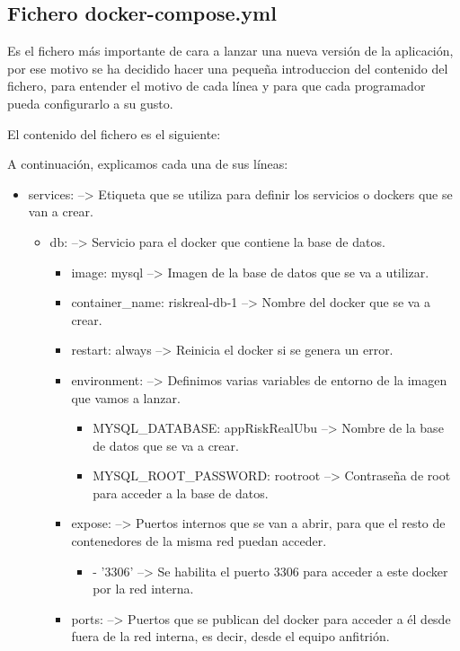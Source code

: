 \subsection{Fichero docker-compose.yml}

Es el fichero más importante de cara a lanzar una nueva versión de la aplicación, por ese motivo se ha decidido hacer una pequeña introduccion del contenido del fichero, para entender el motivo de cada línea y para que cada programador pueda configurarlo a su gusto.

El contenido del fichero es el siguiente:

A continuación, explicamos cada una de sus líneas:
\begin{itemize}
	\item services: --> Etiqueta que se utiliza para definir los servicios o dockers que se van a crear.
	\begin{itemize}
		\item db: --> Servicio para el docker que contiene la base de datos.
		\begin{itemize}
			\item image: mysql --> Imagen de la base de datos que se va a utilizar.
			\item container\_name: riskreal-db-1 --> Nombre del docker que se va a crear.
			\item restart: always --> Reinicia el docker si se genera un error.
			\item environment: --> Definimos varias variables de entorno de la imagen que vamos a lanzar.
			\begin{itemize}
				\item MYSQL\_DATABASE: appRiskRealUbu --> Nombre de la base de datos que se va a crear.
				\item MYSQL\_ROOT\_PASSWORD: rootroot --> Contraseña de root para acceder a la base de datos.
			\end{itemize}
			\item expose: --> Puertos internos que se van a abrir, para que el resto de contenedores de la misma red puedan acceder.
			\begin{itemize}
				\item - '3306' --> Se habilita el puerto 3306 para acceder a este docker por la red interna.
			\end{itemize}
			\item ports: --> Puertos que se publican del docker para acceder a él desde fuera de la red interna, es decir, desde el equipo anfitrión.

\end{itemize}
\end{itemize}
\end{itemize}
